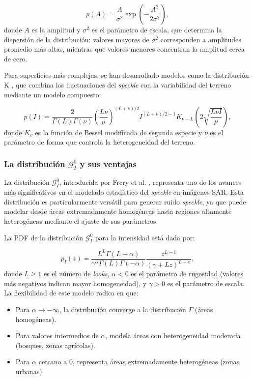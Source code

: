 \begin{equation}
	p(A) = \frac{A}{\sigma^2} \exp\left(-\frac{A^2}{2\sigma^2}\right),
\end{equation}
donde $A$ es la amplitud y $\sigma^2$ es el parámetro de escala, que determina la dispersión de la distribución: valores mayores de $\sigma^2$ corresponden a amplitudes promedio más altas, mientras que valores menores concentran la amplitud cerca de cero.

Para superficies más complejas, se han desarrollado modelos como la distribución K \cite{jao1984amplitude}, que combina las fluctuaciones del \emph{speckle} con la variabilidad del terreno mediante un modelo compuesto:

\begin{equation}
	p(I) = \frac{2}{\Gamma(L)\Gamma(\nu)}\left(\frac{L\nu}{\mu}\right)^{(L+\nu)/2} I^{(L+\nu)/2-1} K_{\nu-L}\left(2\sqrt{\frac{L\nu I}{\mu}}\right),
\end{equation}
donde $K_v$ es la función de Bessel modificada de segunda especie y $\nu$ es el parámetro de forma que controla la heterogeneidad del terreno.

\subsubsection{La distribución $\mathcal{G}_I^0$ y sus ventajas}

La distribución $\mathcal{G}_I^0$, introducida por Frery et al. \cite{originalGI0}, representa uno de los avances más significativos en el modelado estadístico del \emph{speckle} en imágenes SAR. Esta distribución es particularmente versátil para generar ruido \emph{speckle}, ya que puede modelar desde áreas extremadamente homogéneas hasta regiones altamente heterogéneas mediante el ajuste de sus parámetros.

La PDF de la distribución $\mathcal{G}_I^0$ para la intensidad está dada por:

\begin{equation}
	p_I(z) = \frac{L^L \Gamma(L-\alpha)}{\gamma^\alpha \Gamma(L)\Gamma(-\alpha)} \frac{z^{L-1}}{(\gamma + Lz)^{L-\alpha}},
\end{equation}
donde $L\geq 1$ es el número de \emph{looks}, $\alpha < 0$ es el parámetro de rugosidad (valores más negativos indican mayor homogeneidad), y $\gamma>0$ es el parámetro de escala. La flexibilidad de este modelo radica en que:

\begin{itemize}
	\item Para $\alpha \to -\infty$, la distribución converge a la distribución $\Gamma$ (áreas homogéneas).
	\item Para valores intermedios de $\alpha$, modela áreas con heterogeneidad moderada (bosques, zonas agrícolas).
	\item Para $\alpha$ cercano a 0, representa áreas extremadamente heterogéneas (zonas urbanas).
\end{itemize}

